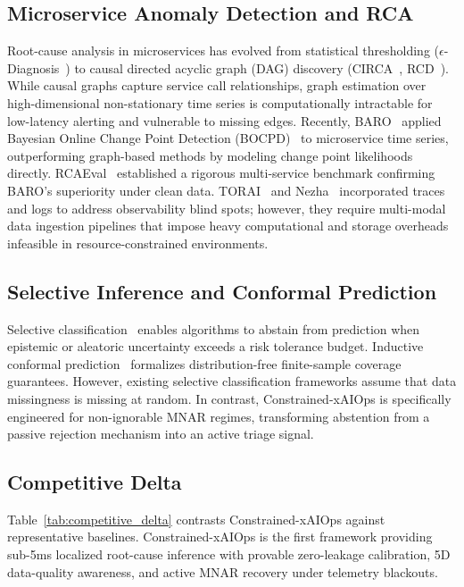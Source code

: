 \documentclass[conference]{IEEEtran}
\begin{document}
\subsection{Microservice Anomaly Detection and RCA}
Root-cause analysis in microservices has evolved from statistical thresholding ($\epsilon$-Diagnosis~\cite{shan2019ediagnosis}) to causal directed acyclic graph (DAG) discovery (CIRCA~\cite{li2022circa}, RCD~\cite{ikram2022rcd}). While causal graphs capture service call relationships, graph estimation over high-dimensional non-stationary time series is computationally intractable for low-latency alerting and vulnerable to missing edges. 
Recently, BARO~\cite{pham2024baro} applied Bayesian Online Change Point Detection (BOCPD)~\cite{adams2007bayesian} to microservice time series, outperforming graph-based methods by modeling change point likelihoods directly. RCAEval~\cite{pham2025rcaeval} established a rigorous multi-service benchmark confirming BARO's superiority under clean data. TORAI~\cite{pham2026torai} and Nezha~\cite{yu2023nezha} incorporated traces and logs to address observability blind spots; however, they require multi-modal data ingestion pipelines that impose heavy computational and storage overheads infeasible in resource-constrained environments.

\subsection{Selective Inference and Conformal Prediction}
Selective classification~\cite{geifman2017selective} enables algorithms to abstain from prediction when epistemic or aleatoric uncertainty exceeds a risk tolerance budget. Inductive conformal prediction~\cite{vovk2005algorithmic,angelopoulos2021gentle} formalizes distribution-free finite-sample coverage guarantees. However, existing selective classification frameworks assume that data missingness is missing at random. In contrast, Constrained-xAIOps is specifically engineered for non-ignorable MNAR regimes, transforming abstention from a passive rejection mechanism into an active triage signal.

\subsection{Competitive Delta}
Table~\ref{tab:competitive_delta} contrasts Constrained-xAIOps against representative baselines. Constrained-xAIOps is the first framework providing sub-5ms localized root-cause inference with provable zero-leakage calibration, 5D data-quality awareness, and active MNAR recovery under telemetry blackouts.
\end{document}
